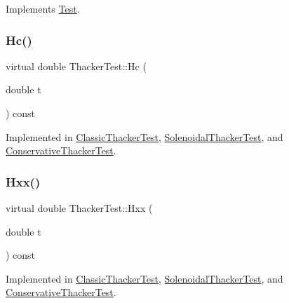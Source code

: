 Implements \hyperlink{classTest_a44ddc98e99388649978d7fb0c8173a9f}{Test}.

\mbox{\label{classThackerTest_a9a8565b3a9e9bf1e56407d2844bd8517}} 
\subsubsection{\texorpdfstring{Hc()}{Hc()}}
{\footnotesize\ttfamily virtual double Thacker\+Test\+::\+Hc (\begin{DoxyParamCaption}\item[{double}]{t }\end{DoxyParamCaption}) const\hspace{0.3cm}{\ttfamily [pure virtual]}}



Implemented in \hyperlink{classClassicThackerTest_a92f8906e919b046b788aeb88b446884b}{Classic\+Thacker\+Test}, \hyperlink{classSolenoidalThackerTest_a381f6b858454265337bf63e4e615f3cb}{Solenoidal\+Thacker\+Test}, and \hyperlink{classConservativeThackerTest_ab2be6c9605361b6cbc446499cd098814}{Conservative\+Thacker\+Test}.

\mbox{\label{classThackerTest_a137a136dd1261b4a97a63831841d611b}} 
\subsubsection{\texorpdfstring{Hxx()}{Hxx()}}
{\footnotesize\ttfamily virtual double Thacker\+Test\+::\+Hxx (\begin{DoxyParamCaption}\item[{double}]{t }\end{DoxyParamCaption}) const\hspace{0.3cm}{\ttfamily [pure virtual]}}



Implemented in \hyperlink{classClassicThackerTest_a5c802e8ef039c0620dc2908987c9097e}{Classic\+Thacker\+Test}, \hyperlink{classSolenoidalThackerTest_adf33889c1fe87e10802f321c509aceb7}{Solenoidal\+Thacker\+Test}, and \hyperlink{classConservativeThackerTest_a578c112c91fc753f5cd550fca2603f8a}{Conservative\+Thacker\+Test}.

\mbox{\label{classThackerTest_a309f6008f53c7084163ce52cd381efc7}} 
